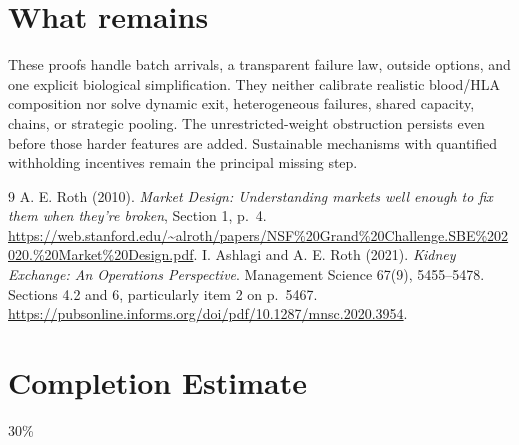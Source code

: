 \documentclass[11pt]{article}
\theoremstyle{remark}
\begin{document}
\section{What remains}
These proofs handle batch arrivals, a transparent failure law, outside
options, and one explicit biological simplification. They neither
calibrate realistic blood/HLA composition nor solve dynamic exit,
heterogeneous failures, shared capacity, chains, or strategic pooling.
The unrestricted-weight obstruction persists even before those harder
features are added. Sustainable mechanisms with quantified withholding
incentives remain the principal missing step.
\begin{thebibliography}{9}
 A. E. Roth (2010). \emph{Market Design: Understanding
markets well enough to fix them when they're broken}, Section 1, p.~4.
\url{https://web.stanford.edu/~alroth/papers/NSF%20Grand%20Challenge.SBE%202020.%20Market%20Design.pdf}.
 I. Ashlagi and A. E. Roth (2021). \emph{Kidney Exchange:
An Operations Perspective}. Management Science 67(9), 5455--5478.
Sections 4.2 and 6, particularly item 2 on p.~5467.
\url{https://pubsonline.informs.org/doi/pdf/10.1287/mnsc.2020.3954}.
\end{thebibliography}

\section{Completion Estimate}
30\%
\end{document}
